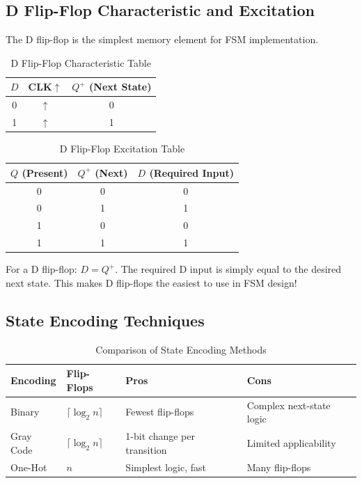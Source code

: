 \documentclass[12pt,a4paper]{article}
\begin{document}
\subsection{D Flip-Flop Characteristic and Excitation}

The D flip-flop is the simplest memory element for FSM implementation.

\begin{table}[H]
\centering
\caption{D Flip-Flop Characteristic Table}
\begin{tabular}{cc|c}
\toprule
$D$ & CLK$\uparrow$ & $Q^+$ (Next State) \\
\midrule
0 & $\uparrow$ & 0 \\
1 & $\uparrow$ & 1 \\
\bottomrule
\end{tabular}
\end{table}

\begin{table}[H]
\centering
\caption{D Flip-Flop Excitation Table}
\begin{tabular}{cc|c}
\toprule
$Q$ (Present) & $Q^+$ (Next) & $D$ (Required Input) \\
\midrule
0 & 0 & 0 \\
0 & 1 & 1 \\
1 & 0 & 0 \\
1 & 1 & 1 \\
\bottomrule
\end{tabular}
\end{table}

\begin{infobox}
For a D flip-flop: $D = Q^+$. The required D input is simply equal to the desired next state. This makes D flip-flops the easiest to use in FSM design!
\end{infobox}


\subsection{State Encoding Techniques}

\begin{table}[H]
\centering
\caption{Comparison of State Encoding Methods}
\begin{tabular}{lp{3cm}p{3cm}p{3cm}}
\toprule
\textbf{Encoding} & \textbf{Flip-Flops} & \textbf{Pros} & \textbf{Cons} \\
\midrule
Binary & $\lceil\log_2 n\rceil$ & Fewest flip-flops & Complex next-state logic \\
Gray Code & $\lceil\log_2 n\rceil$ & 1-bit change per transition & Limited applicability \\
One-Hot & $n$ & Simplest logic, fast & Many flip-flops \\
\bottomrule
\end{tabular}
\end{table}
\end{document}

